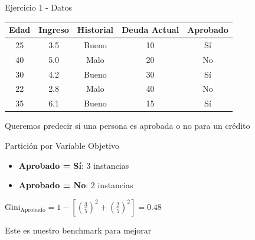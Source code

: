 \documentclass{beamer}
\begin{document}
\begin{frame}{Ejercicio 1 - Datos}
    \begin{center}
        \begin{tabular}{ccccc}
            \toprule
            Edad & Ingreso & Historial & Deuda Actual & Aprobado \\
            \midrule
            25 & 3.5 & Bueno & 10 & Sí \\
            40 & 5.0 & Malo & 20 & No \\
            30 & 4.2 & Bueno & 30 & Sí \\
            22 & 2.8 & Malo & 40 & No \\
            35 & 6.1 & Bueno & 15 & Sí \\
            \bottomrule
        \end{tabular}
    \end{center}
    
    \vspace{1em}
    
    \begin{center}
        \Large Queremos predecir si una persona es aprobada o no para un crédito
    \end{center}
\end{frame}

\begin{frame}{Partición por Variable Objetivo}
    \begin{itemize}
        \item \textbf{Aprobado = Sí}: 3 instancias
        \item \textbf{Aprobado = No}: 2 instancias
    \end{itemize}
    
    \vspace{1em}
    
    \begin{center}
        \Large $\mathrm{Gini}_{\text{Aprobado}} = 1 - \left[\left(\tfrac{3}{5}\right)^2 + \left(\tfrac{2}{5}\right)^2\right] = 0.48$
    \end{center}
    
    \vspace{1em}
    
    \begin{center}
        Este es nuestro benchmark para mejorar
    \end{center}
\end{frame}
\end{document}
